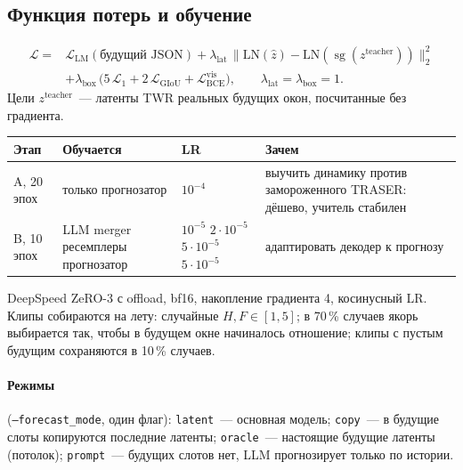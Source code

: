 \documentclass[11pt,a4paper]{article}
\newcommand{\code}[1]{\texttt{#1}}
\begin{document}
\subsection{Функция потерь и обучение}
\[
\begin{aligned}
\mathcal L = {} & \mathcal L_{\text{LM}}(\text{будущий JSON})
  + \lambda_{\text{lat}}\,\bigl\lVert \mathrm{LN}(\hat z) - \mathrm{LN}(\operatorname{sg}(z^{\text{teacher}}))\bigr\rVert_2^2 \\
  & + \lambda_{\text{box}}\,\bigl(5\,\mathcal L_{1} + 2\,\mathcal L_{\text{GIoU}} + \mathcal L_{\text{BCE}}^{\text{vis}}\bigr),
\qquad \lambda_{\text{lat}}=\lambda_{\text{box}}=1.
\end{aligned}
\]
Цели $z^{\text{teacher}}$~--- латенты TWR реальных будущих окон, посчитанные без градиента.

\begin{center}
\begin{tabularx}{\linewidth}{@{}lp{3.6cm}p{2.6cm}L@{}}
\toprule
Этап & Обучается & LR & Зачем \\
\midrule
A, 20 эпох & только прогнозатор & $10^{-4}$ & выучить динамику против замороженного TRASER: дёшево, учитель стабилен \\
B, 10 эпох & LLM \newline merger \newline ресемплеры \newline прогнозатор
           & $10^{-5}$ \newline $2\cdot10^{-5}$ \newline $5\cdot10^{-5}$ \newline $5\cdot10^{-5}$ & адаптировать декодер к прогнозу \\
\bottomrule
\end{tabularx}
\end{center}
DeepSpeed ZeRO-3 с offload, bf16, накопление градиента 4, косинусный LR.
Клипы собираются на лету: случайные $H,F\in[1,5]$; в 70\,\% случаев якорь выбирается так,
чтобы в будущем окне начиналось отношение; клипы с пустым будущим сохраняются в 10\,\% случаев.

\paragraph{Режимы} (\code{--forecast\_mode}, один флаг): \code{latent}~--- основная модель;
\code{copy}~--- в будущие слоты копируются последние латенты; \code{oracle}~--- настоящие
будущие латенты (потолок); \code{prompt}~--- будущих слотов нет, LLM прогнозирует только по истории.
\end{document}
